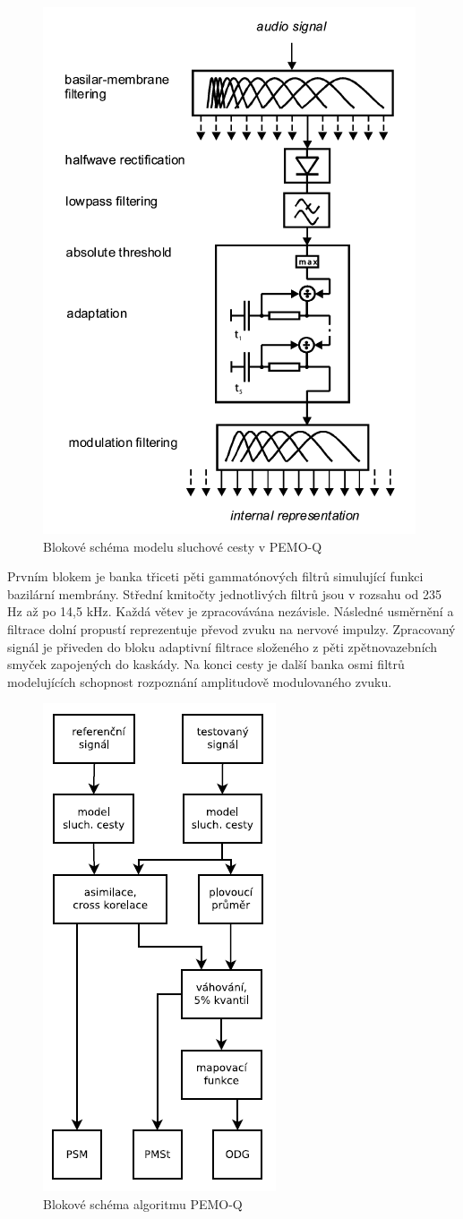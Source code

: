 \begin{figure}[h]
    \centering
    \includegraphics[width = .47\textwidth]{pic/pemoq.png}
    \caption{Blokové schéma modelu sluchové cesty v PEMO-Q\cite{article:pemoq}}
    \label{pic:pemoq}
\end{figure}

Prvním blokem je banka třiceti pěti gammatónových filtrů simulující funkci bazilární membrány. Střední kmitočty jednotlivých filtrů jsou v rozsahu od 235 Hz až po 14,5 kHz. Každá větev je zpracovávána nezávisle. Následné usměrnění a filtrace dolní propustí reprezentuje převod zvuku na nervové impulzy. Zpracovaný signál je přiveden do bloku adaptivní filtrace složeného z pěti zpětnovazebních smyček zapojených do kaskády. Na konci cesty je další banka osmi filtrů modelujících schopnost rozpoznání amplitudově modulovaného zvuku.

\begin{figure}[h]
    \centering
    \includegraphics[width = .25\textwidth]{pic/pemoq2.png}
    \caption{Blokové schéma algoritmu PEMO-Q \cite{thesis:zalabak}}
    \label{pic:pemoq2}
\end{figure}

